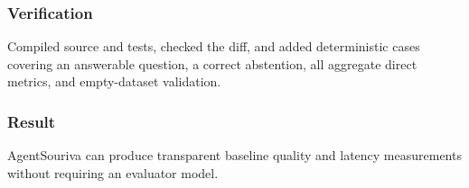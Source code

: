 \subsubsection{Verification}

Compiled source and tests, checked the diff, and added deterministic cases covering an answerable question, a correct abstention, all aggregate direct metrics, and empty-dataset validation.

\subsubsection{Result}

AgentSouriva can produce transparent baseline quality and latency measurements without requiring an evaluator model.

